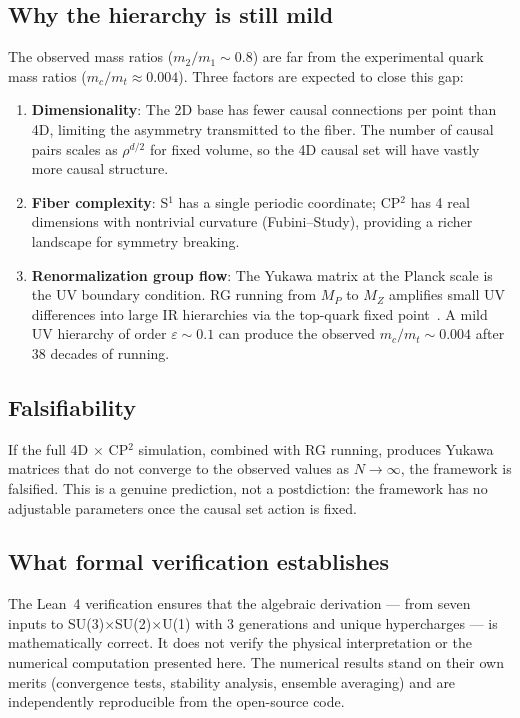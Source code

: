 \documentclass[12pt,a4paper]{article}
\begin{document}
\subsection{Why the hierarchy is still mild}

The observed mass ratios ($m_2/m_1 \sim 0.8$) are far from the
experimental quark mass ratios ($m_c/m_t \approx 0.004$).  Three
factors are expected to close this gap:

\begin{enumerate}
\item \textbf{Dimensionality}: The 2D base has fewer causal
  connections per point than 4D, limiting the asymmetry transmitted to
  the fiber.  The number of causal pairs scales as $\rho^{d/2}$ for
  fixed volume, so the 4D causal set will have vastly more causal
  structure.

\item \textbf{Fiber complexity}: S$^1$ has a single periodic
  coordinate; CP$^2$ has 4 real dimensions with nontrivial curvature
  (Fubini--Study), providing a richer landscape for symmetry breaking.

\item \textbf{Renormalization group flow}: The Yukawa matrix at the
  Planck scale is the UV boundary condition.  RG running from $M_P$
  to $M_Z$ amplifies small UV differences into large IR hierarchies
  via the top-quark fixed point~\cite{pendleton_ross}.  A mild UV
  hierarchy of order $\varepsilon \sim 0.1$ can produce the observed
  $m_c/m_t \sim 0.004$ after 38 decades of running.
\end{enumerate}

\subsection{Falsifiability}

If the full 4D $\times$ CP$^2$ simulation, combined with RG running,
produces Yukawa matrices that do not converge to the observed values
as $N \to \infty$, the framework is falsified.  This is a genuine
prediction, not a postdiction: the framework has no adjustable
parameters once the causal set action is fixed.

\subsection{What formal verification establishes}

The Lean~4 verification ensures that the algebraic derivation ---
from seven inputs to SU(3)$\times$SU(2)$\times$U(1) with 3
generations and unique hypercharges --- is mathematically correct.
It does not verify the physical interpretation or the numerical
computation presented here.  The numerical results stand on their
own merits (convergence tests, stability analysis, ensemble
averaging) and are independently reproducible from the open-source
code.
\end{document}
